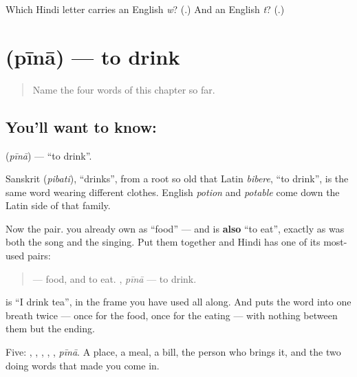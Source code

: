 \begin{tcolorbox}[breakable,colback=teal!4,colframe=teal!35!black,title={Before you move on}]
Which Hindi letter carries an English \emph{w}? (.) And an English \emph{t}? (.)
\end{tcolorbox}
\section[\texorpdfstring{\hi{पीना} / \hi{पीता} … (pīnā / pītā …)}{पीना / पीता … (pīnā / pītā …)}]{ (pīnā) — to drink}

\label{lesson:HI-C73-drink}



\begin{quote}
Name the four words of this chapter so far.
\end{quote}

\subsection*{You'll want to know: }
\textbf{} (\emph{pīnā}) — \textquotedblleft{}to drink\textquotedblright{}.

Sanskrit  (\emph{pibati}), \textquotedblleft{}drinks\textquotedblright{}, from a root so old that Latin \emph{bibere}, \textquotedblleft{}to drink\textquotedblright{}, is the same word wearing different clothes. English \emph{potion} and \emph{potable} come down the Latin side of that family.

Now the pair. \textbf{} you already own as \textquotedblleft{}food\textquotedblright{} — and  is \textbf{also} \textquotedblleft{}to eat\textquotedblright{}, exactly as  was both the song and the singing. Put them together and Hindi has one of its most-used pairs:

\begin{quote}
\textbf{} — food, and to eat. \textbf{}, \emph{pīnā} — to drink.
\end{quote}

\textbf{   } is \textquotedblleft{}I drink tea\textquotedblright{}, in the frame you have used all along. And \textbf{   } puts the word into one breath twice — once for the food, once for the eating — with nothing between them but the ending.

\begin{grammarlens}[title={What you've built}]
Five: , , , , \textbf{}, \emph{pīnā}. A place, a meal, a bill, the person who brings it, and the two doing words that made you come in.
\end{grammarlens}

